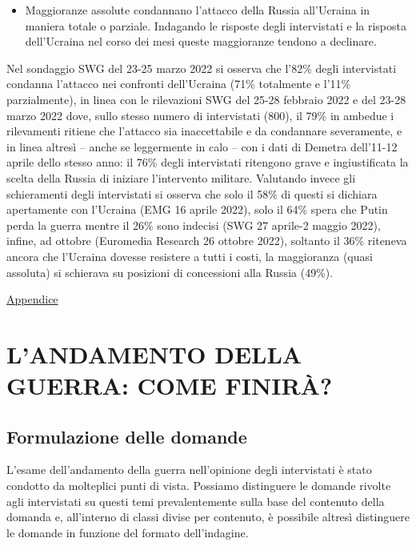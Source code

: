 \documentclass[
  openany]{book}
\providecommand{\tightlist}{%
  \setlength{\itemsep}{0pt}\setlength{\parskip}{0pt}}
\begin{document}
\begin{itemize}
\tightlist
\item
  Maggioranze assolute condannano l'attacco della Russia all'Ucraina in maniera totale o parziale. Indagando le risposte degli intervistati e la risposta dell'Ucraina nel corso dei mesi queste maggioranze tendono a declinare.
\end{itemize}

Nel sondaggio SWG del 23-25 marzo 2022 si osserva che l'82\% degli intervistati condanna l'attacco nei confronti dell'Ucraina (71\% totalmente e l'11\% parzialmente), in linea con le rilevazioni SWG del 25-28 febbraio 2022 e del 23-28 marzo 2022 dove, sullo stesso numero di intervistati (800), il 79\% in ambedue i rilevamenti ritiene che l'attacco sia inaccettabile e da condannare severamente, e in linea altresì -- anche se leggermente in calo -- con i dati di Demetra dell'11-12 aprile dello stesso anno: il 76\% degli intervistati ritengono grave e ingiustificata la scelta della Russia di iniziare l'intervento militare. Valutando invece gli schieramenti degli intervistati si osserva che solo il 58\% di questi si dichiara apertamente con l'Ucraina (EMG 16 aprile 2022), solo il 64\% spera che Putin perda la guerra mentre il 26\% sono indecisi (SWG 27 aprile-2 maggio 2022), infine, ad ottobre (Euromedia Research 26 ottobre 2022), soltanto il 36\% riteneva ancora che l'Ucraina dovesse resistere a tutti i costi, la maggioranza (quasi assoluta) si schierava su posizioni di concessioni alla Russia (49\%).

\href{https://github.com/LucianaFazio/Ucrania/blob/main/PDF_Appendice/III.\%20Le\%20cause\%20della\%20guerra_v.5.pdf}{Appendice}

\hypertarget{landamento-della-guerra-come-finiruxe0}{%
\chapter{L'ANDAMENTO DELLA GUERRA: COME FINIRÀ?}\label{landamento-della-guerra-come-finiruxe0}}

\hypertarget{formulazione-delle-domande-2}{%
\section{Formulazione delle domande}\label{formulazione-delle-domande-2}}

L'esame dell'andamento della guerra nell'opinione degli intervistati è stato condotto da molteplici punti di vista. Possiamo distinguere le domande rivolte agli intervistati su questi temi prevalentemente sulla base del contenuto della domanda e, all'interno di classi divise per contenuto, è possibile altresì distinguere le domande in funzione del formato dell'indagine.
\end{document}
